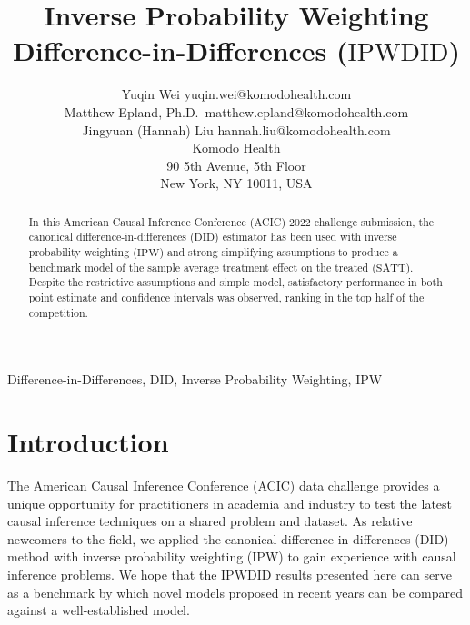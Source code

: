 \documentclass[twoside,11pt]{article}
\newcommand*{\DID}{\ensuremath{\text{DID}}\xspace}
\newcommand*{\IPW}{\ensuremath{\text{IPW}}\xspace}
\newcommand*{\IPWDID}{\ensuremath{\text{IPWDID}}\xspace}
\newcommand*{\SATT}{\ensuremath{\text{SATT}}\xspace}
\begin{document}
\title{Inverse Probability Weighting Difference-in-Differences (\IPWDID)}

\author{\name Yuqin Wei \email yuqin.wei@komodohealth.com \\
\name Matthew Epland, Ph.D.\ \email matthew.epland@komodohealth.com \\
\name Jingyuan (Hannah) Liu \email hannah.liu@komodohealth.com \\
\addr Komodo Health \\
90 5th Avenue, 5th Floor \\
New York, NY 10011, USA}

\maketitle

\begin{abstract}%
In this American Causal Inference Conference (ACIC) 2022 challenge submission,
the canonical difference-in-differences (\DID) estimator
has been used with inverse probability weighting (\IPW)
and strong simplifying assumptions
to produce a benchmark model of the
sample average treatment effect on the treated (\SATT).
Despite the restrictive assumptions and simple model,
satisfactory performance in both point estimate and confidence intervals was observed,
ranking in the top half of the competition.
\end{abstract}

\begin{keywords}
Difference-in-Differences,
\DID,
Inverse Probability Weighting,
\IPW
\end{keywords}

\section{Introduction}
\label{intro}

The American Causal Inference Conference (ACIC) data challenge
provides a unique opportunity for practitioners in academia and industry
to test the latest causal inference techniques on a shared problem and dataset.
As relative newcomers to the field, we applied
the canonical difference-in-differences (\DID)
method with inverse probability weighting (\IPW)
to gain experience with causal inference problems.
We hope that the \IPWDID results presented here
can serve as a benchmark by which novel models proposed in recent years
can be compared against a well-established model.
\end{document}
